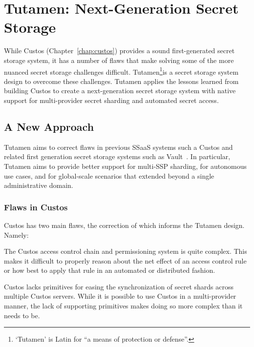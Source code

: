 \chapter{Tutamen: Next-Generation Secret Storage}
\label{chap:tutamen}

While Custos (Chapter~\ref{chap:custos}) provides a sound
first-generated secret storage system, it has a number of flaws that
make solving some of the more nuanced secret storage challenges
difficult. Tutamen\footnote{`Tutamen' is Latin for ``a means of
  protection or defense''.}is a secret storage system design to
overcome these challenges. Tutamen applies the lessons learned from
building Custos to create a next-generation secret storage system with
native support for multi-provider secret sharding and automated secret
access.

\section{A New Approach}
\label{chap:tutamen:new}

Tutamen aims to correct flaws in previous SSaaS systems such a Custos
and related first generation secret storage systems such as
Vault~\cite{vault}. In particular, Tutamen aims to provide better
support for multi-SSP sharding, for autonomous use cases, and for
global-scale scenarios that extended beyond a single administrative
domain.

\subsection{Flaws in Custos}

Custos has two main flaws, the correction of which informs the Tutamen
design. Namely:

\begin{packed_item}
\item The Custos access control chain and permissioning system is
  quite complex. This makes it difficult to properly reason about the
  net effect of an access control rule or how best to apply that rule
  in an automated or distributed fashion.
\item Custos lacks primitives for easing the synchronization of secret
  shards across multiple Custos servers. While it is possible to use
  Custos in a multi-provider manner, the lack of supporting primitives
  makes doing so more complex than it needs to be.
\end{packed_item}

